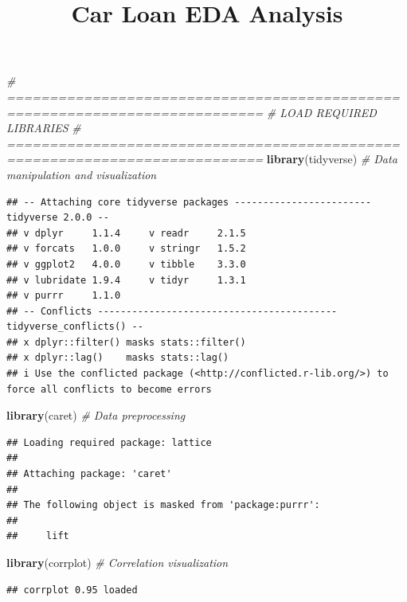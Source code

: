 \documentclass[
]{article}
\title{Car Loan EDA Analysis}
\author{}
\date{\vspace{-2.5em}}
\newenvironment{Shaded}{\begin{snugshade}}{\end{snugshade}}
\newcommand{\CommentTok}[1]{\textcolor[rgb]{0.56,0.35,0.01}{\textit{#1}}}
\newcommand{\FunctionTok}[1]{\textcolor[rgb]{0.13,0.29,0.53}{\textbf{#1}}}
\newcommand{\NormalTok}[1]{#1}
\begin{document}
\maketitle

{
\setcounter{tocdepth}{2}
\tableofcontents
}
\begin{Shaded}
\begin{Highlighting}[]
\CommentTok{\# ============================================================================}
\CommentTok{\# LOAD REQUIRED LIBRARIES}
\CommentTok{\# ============================================================================}
\FunctionTok{library}\NormalTok{(tidyverse)      }\CommentTok{\# Data manipulation and visualization}
\end{Highlighting}
\end{Shaded}

\begin{verbatim}
## -- Attaching core tidyverse packages ------------------------ tidyverse 2.0.0 --
## v dplyr     1.1.4     v readr     2.1.5
## v forcats   1.0.0     v stringr   1.5.2
## v ggplot2   4.0.0     v tibble    3.3.0
## v lubridate 1.9.4     v tidyr     1.3.1
## v purrr     1.1.0     
## -- Conflicts ------------------------------------------ tidyverse_conflicts() --
## x dplyr::filter() masks stats::filter()
## x dplyr::lag()    masks stats::lag()
## i Use the conflicted package (<http://conflicted.r-lib.org/>) to force all conflicts to become errors
\end{verbatim}

\begin{Shaded}
\begin{Highlighting}[]
\FunctionTok{library}\NormalTok{(caret)          }\CommentTok{\# Data preprocessing}
\end{Highlighting}
\end{Shaded}

\begin{verbatim}
## Loading required package: lattice
## 
## Attaching package: 'caret'
## 
## The following object is masked from 'package:purrr':
## 
##     lift
\end{verbatim}

\begin{Shaded}
\begin{Highlighting}[]
\FunctionTok{library}\NormalTok{(corrplot)       }\CommentTok{\# Correlation visualization}
\end{Highlighting}
\end{Shaded}

\begin{verbatim}
## corrplot 0.95 loaded
\end{verbatim}
\end{document}

